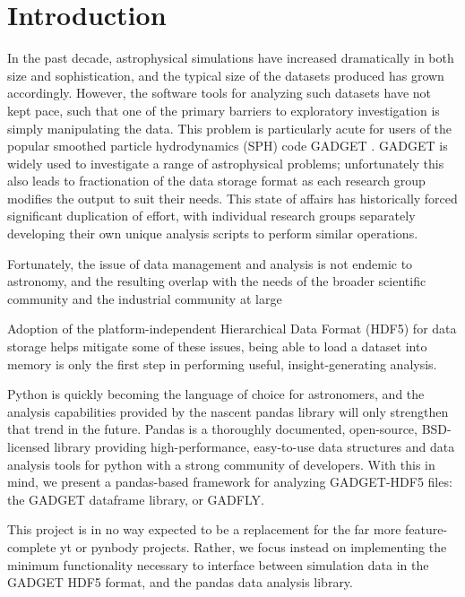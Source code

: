 \section{Introduction}
\label{intro}

In the past decade, astrophysical simulations have increased dramatically in both size and sophistication, and the typical size of the datasets produced has grown accordingly.  
However, the software tools for analyzing such datasets have not kept pace, such that one of the primary barriers to exploratory investigation is simply manipulating the data.  
This problem is particularly acute for users of the popular smoothed particle hydrodynamics (SPH) code GADGET \citep{SpringelYoshidaWhite2001,Springel2005}.  
GADGET is widely used to investigate a range of astrophysical problems; unfortunately this also leads to fractionation of the data storage format as each research group modifies the output to suit their needs.
This state of affairs has historically forced significant duplication of effort, with individual research groups separately developing their own unique analysis scripts to perform similar operations.

Fortunately, the issue of data management and analysis is not endemic to astronomy, and the resulting overlap with the needs of the broader scientific community and the industrial community at large 

Adoption of the platform-independent Hierarchical Data Format (HDF5) for data storage helps mitigate some of these issues, being able to load a dataset into memory is only the first step in performing useful, insight-generating analysis.  

Python is quickly becoming the language of choice for astronomers, and the analysis capabilities provided by the nascent pandas library will only strengthen that trend in the future.  Pandas is a thoroughly documented, open-source, BSD-licensed library providing high-performance, easy-to-use data structures and data analysis tools for python with a strong community of developers. With this in mind, we present a pandas-based framework for analyzing GADGET-HDF5 files: the GADGET dataframe library, or GADFLY.

This project is in no way expected to be a replacement for the far more feature-complete yt or pynbody projects. Rather, we focus instead on implementing the minimum functionality necessary to interface between simulation data in the GADGET HDF5 format, and the pandas data analysis library.